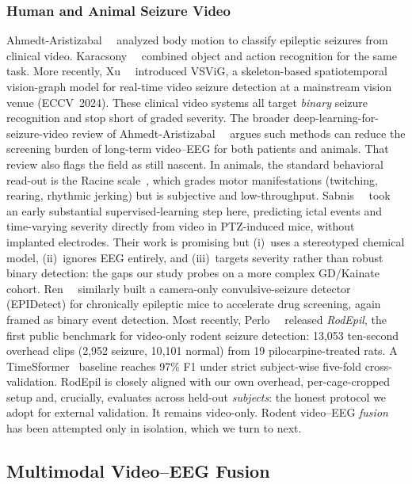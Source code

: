 \subsubsection{Human and Animal Seizure Video}
Ahmedt-Aristizabal~\etal~\cite{ahmedt2018} analyzed body motion to classify
epileptic seizures from clinical video. Karacsony~\etal~\cite{karacsony2020seizure}
combined object and action recognition for the same task. More recently,
Xu~\etal~\cite{vsvig2024} introduced VSViG, a skeleton-based spatiotemporal
vision-graph model for real-time video seizure detection at a mainstream vision
venue (ECCV~2024). These clinical video systems all target \emph{binary} seizure
recognition and stop short of graded severity. The broader
deep-learning-for-seizure-video review of Ahmedt-Aristizabal~\etal~\cite{deeplearning_video_review2024}
argues such methods can reduce the screening burden of long-term video--EEG for
both patients and animals. That review also flags the field as still nascent. In animals,
the standard behavioral read-out is the Racine scale~\cite{racine1972}, which
grades motor manifestations (twitching, rearing, rhythmic jerking) but is
subjective and low-throughput. Sabnis~\etal~\cite{sabnis2024} took an early
substantial supervised-learning step here, predicting ictal events and
time-varying severity directly from video in PTZ-induced mice, without implanted
electrodes. Their work is promising but (i)~uses a stereotyped chemical model,
(ii)~ignores EEG entirely, and (iii)~targets severity rather than robust binary detection: the gaps our study probes on a more
complex GD/Kainate cohort. Ren~\etal~\cite{epidetect2024} similarly built a
camera-only convulsive-seizure detector (EPIDetect) for chronically epileptic
mice to accelerate drug screening, again framed as binary event detection. Most recently, Perlo~\etal~\cite{rodepil2025} released
\emph{RodEpil}, the first public benchmark for video-only rodent seizure
detection: 13{,}053 ten-second overhead clips (2{,}952 seizure, 10{,}101 normal)
from 19 pilocarpine-treated rats. A TimeSformer~\cite{bertasius2021timesformer}
baseline reaches 97\% F1 under strict subject-wise five-fold cross-validation. RodEpil is closely aligned with our own overhead, per-cage-cropped setup and,
crucially, evaluates across held-out \emph{subjects}: the honest protocol we
adopt for external validation. It remains video-only. Rodent video--EEG
\emph{fusion} has been attempted only in isolation, which we turn to next.

\subsection{Multimodal Video--EEG Fusion}
\label{sec:fusion}

